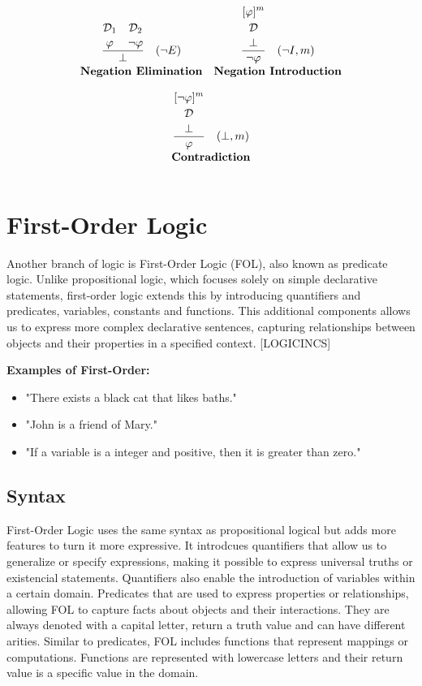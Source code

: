 \[\begin{array}{c c}
\frac{\overset{\displaystyle\mathcal{D}_1\strut}{\displaystyle \varphi \strut}\quad \overset{\displaystyle\mathcal{D}_2\strut} {\displaystyle \neg \varphi \strut}}{\displaystyle\bot\strut} \quad (\neg E) 
& \frac{\overset{\displaystyle[\varphi]^m\strut}{\overset{\displaystyle\mathcal{D} \strut} {\displaystyle\bot 
\strut}}}{\displaystyle\neg \varphi\strut} \quad (\neg I, m) \\[5pt]
\textbf{Negation Elimination} & \textbf{Negation Introduction}\\[10pt]

\multicolumn{2}{c}{
\frac{\overset{\displaystyle[\neg\varphi]^m\strut}{\overset{\displaystyle\mathcal{D} \strut} {\displaystyle\bot 
\strut}}}{\displaystyle \varphi\strut} \quad (\bot, m)
} \\[5pt]
\multicolumn{2}{c}{\textbf{Contradiction}} \\[10pt]

\end{array}
\]


\section{First-Order Logic}
\label{chap:fol}
Another branch of logic is First-Order Logic (FOL), also known as predicate logic. Unlike propositional logic, which focuses solely on simple declarative statements, first-order logic extends this by introducing quantifiers and predicates, variables, constants and functions. This additional components allows us to express more complex declarative sentences, capturing relationships between objects and their properties in a specified context. [LOGICINCS]

\textbf{Examples of First-Order:}
\begin{itemize}  
    \item "There exists a black cat that likes baths." 
    \item "John is a friend of Mary." 
    \item "If a variable is a integer and positive, then it is greater than zero." 
\end{itemize}  

\subsection{Syntax}
First-Order Logic uses the same syntax as propositional logical but adds more features to turn it more expressive. It introdcues quantifiers that allow us to generalize or specify expressions, making it possible to express universal truths or existencial statements. Quantifiers also enable the introduction of variables within a certain domain. Predicates that are used to express properties or relationships, allowing FOL to capture facts about objects and their interactions. They are always denoted with a capital letter, return a truth value and can have different arities. Similar to predicates, FOL includes functions that represent mappings or computations. Functions are represented with lowercase letters and their return value is a specific value in the domain.

